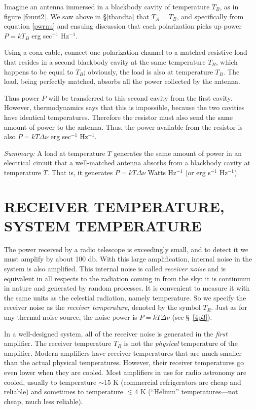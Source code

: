 \documentclass[psfig,preprint]{aastex}
\begin{document}
	Imagine an antenna immersed in a blackbody cavity of temperature
$T_B$, as in figure \ref{fount2}.   We saw above in \S \ref{tbandta}
that $T_A = T_B$, and specifically from equation \ref{pwrnu} and ensuing
discussion that each polarization picks up power $P = kT_B$ erg
sec$^{-1}$ Hz$^{-1}$.

          Using a coax cable, connect one polarization channel to a
matched resistive load that resides in a second blackbody cavity at the
same temperature $T_B$, which happens to be equal to $T_B$; obviously, the load
is also at temperature $T_B$.  The load, being perfectly matched, absorbs
all the power collected by the antenna.  

	Thus power $P$ will be transferred to this second cavity
from the first cavity.  However, thermodynamics says that this is
impossible, because the two cavities have identical temperatures. 
Therefore the resistor must also send the same amount of power to the
antenna.  Thus, the power available from the resistor is also $P =
k T \Delta \nu$ erg sec$^{-1}$ Hz$^{-1}$. 

	{\it Summary:} A load at temperature $T$ generates the same amount
of power in an electrical circuit that a well-matched antenna absorbs
from a blackbody cavity at temperature $T$. That is, it generates
$P = kT\Delta \nu$ Watts Hz$^{-1}$ (or erg s$^{-1}$ Hz$^{-1}$). 

\section {RECEIVER TEMPERATURE, SYSTEM TEMPERATURE} \label{two}

	The power received by a radio telescope is exceedingly small,
and to detect it we must amplify by about 100 db.  With this large
amplification, internal noise in the system is also amplified.  This
internal noise is called {\it receiver noise} and is equivalent in all
respects to the radiation coming in from the sky: it is continuum in
nature and generated by random processes.  It is convenient to measure
it with the same units as the celestial radiation, namely temperature. 
So we specify the receiver noise as the {\it receiver temperature},
denoted by the symbol $T_R$.  Just as for any thermal noise source, the
noise power is $P = kT \Delta \nu$ (see \S~\ref{4p3}). 

	In a well-designed system, all of the receiver noise is
generated in the {\it first} amplifier. The receiver temperature $T_R$
is not the {\it physical} temperature of the amplifier.  Modern
amplifiers have receiver temperatures that are much smaller than the
actual physical temperatures.  However, their receiver temperatures go
even lower when they are cooled.  Most amplifiers in use for radio
astronomy are cooled, usually to temperature $\sim 15$ K (commercial
refrigerators are cheap and reliable) and sometimes to temperature
$\lesssim 4$ K (``Helium'' temperatures---not cheap, much less
reliable). 
\end{document}
